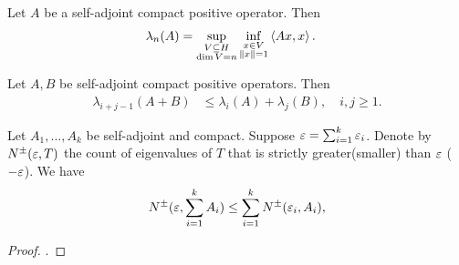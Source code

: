 \begin{lemma}
  Let $A$ be a self-adjoint compact positive operator.
  Then
  \begin{align*}
    \lambda_n(A) &= \sup_{\substack{V \subseteq H \\ \dim V = n}} \inf_{\substack{x \in V \\ \norm{x} = 1}} \left\langle{Ax,x}\right\rangle.
  \end{align*}
\end{lemma}


\begin{lemma}
  \label{lem:A_WeylOp}
  Let $A,B$ be self-adjoint compact positive operators.
  Then
  \begin{align}
    \lambda_{i+j-1}(A+B) & \leq \lambda_{i}(A) +  \lambda_{j}(B),\quad i,j \geq 1.
  \end{align}
\end{lemma}



\begin{lemma}
  \label{lem:seca_SumEigenCount}
  Let $A_1,\dots,A_k$ be self-adjoint and compact.
  Suppose $\varepsilon = \sum_{i=1}^k \varepsilon_i$.
  Denote by $N^{\pm}(\varepsilon,T)$ the count of eigenvalues of $T$ that is strictly greater(smaller) than $\varepsilon$ ($-\varepsilon$).
  We have
  \begin{align}
    N^{\pm}(\varepsilon, \sum_{i=1}^k A_i) \leq \sum_{i=1}^k N^{\pm}(\varepsilon_i,A_i),
  \end{align}
\end{lemma}
\begin{proof}
  \citet[Lemma 5]{widom1963_AsymptoticBehavior}.
\end{proof}





